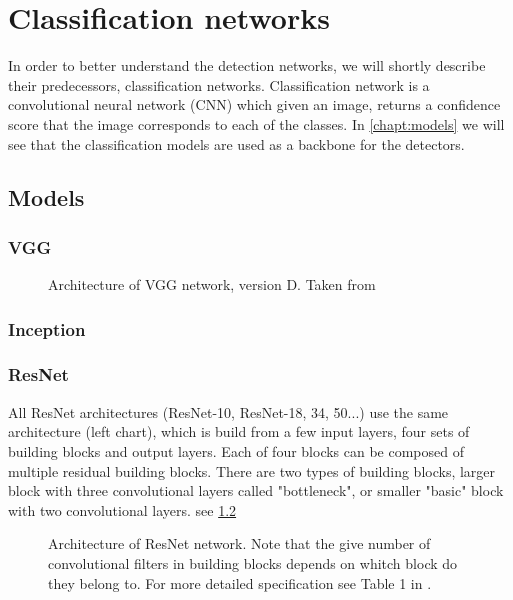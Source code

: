 \chapter{Classification networks}
\label{chapt:cnets}
In order to better understand the detection networks, we will shortly describe their predecessors, classification networks. Classification network is a convolutional neural network (CNN) \cite[ch.~9]{bib:dlbook} which given an image, returns a confidence score that the image corresponds to each of the classes. In \cref{chapt:models} we will see that the classification models are used as a backbone for the detectors.

\section{Models}
\subsection{VGG}
\label{sec:VGG}
\cite{bib:vgg}

\begin{figure}
    \label{fig:resnet_arch}
    \centering
    \vggArch
    \caption{Architecture of VGG network, version D. Taken from \cite[table 1]{bib:vgg}}
\end{figure}

\subsection{Inception}
\label{sec:inception}


\subsection{ResNet}
\label{sec:resnet}

All ResNet \cite{bib:resnet} architectures (ResNet-10, ResNet-18, 34, 50...) use the same architecture (left chart), which is build from a few input layers, four sets of building blocks and output layers. Each of four blocks can be composed of multiple residual building blocks. There are two types of building blocks, larger block with three convolutional layers called "bottleneck", or smaller "basic" block with two convolutional layers.  see \cref{fig:resnet_arch}

\begin{figure}
    \label{fig:resnet_arch}
    \resnetArch
    \caption{Architecture of ResNet network.
    Note that the give number of convolutional filters in building blocks depends on whitch block do they belong to. For more detailed specification see Table 1 in  \cite{bib:resnet}.}
\end{figure}






